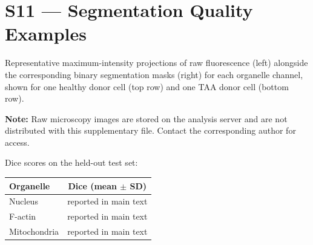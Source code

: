 \documentclass[11pt,a4paper]{article}
\begin{document}
\section*{S11 — Segmentation Quality Examples}
Representative maximum-intensity projections of raw fluorescence (left) alongside
the corresponding binary segmentation masks (right) for each organelle channel,
shown for one healthy donor cell (top row) and one TAA donor cell (bottom row).

\textbf{Note:} Raw microscopy images are stored on the analysis server and are not
distributed with this supplementary file. Contact the corresponding author for access.

Dice scores on the held-out test set:
\begin{center}
\begin{tabular}{lc}\toprule Organelle & Dice (mean $\pm$ SD) \\\midrule
Nucleus & reported in main text \\
F-actin & reported in main text \\
Mitochondria & reported in main text \\
\bottomrule\end{tabular}
\end{center}
\end{document}
